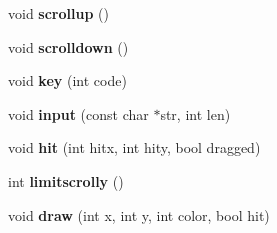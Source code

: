 \begin{DoxyCompactItemize}
void {\bfseries scrollup} ()
\item 
\mbox{\label{structeditor_a6173910e8a38625de244256ece5ee40f}} 
void {\bfseries scrolldown} ()
\item 
\mbox{\label{structeditor_aec26a5e5780a67244ae7edef506bc967}} 
void {\bfseries key} (int code)
\item 
\mbox{\label{structeditor_aceb6a8299b0181d2b88e6439bc5b1d27}} 
void {\bfseries input} (const char $\ast$str, int len)
\item 
\mbox{\label{structeditor_afea643d1c4eba985b6978b228a15f957}} 
void {\bfseries hit} (int hitx, int hity, bool dragged)
\item 
\mbox{\label{structeditor_a61d3b1198c453856c3ae69ce2c92b036}} 
int {\bfseries limitscrolly} ()
\item 
\mbox{\label{structeditor_addadc273617926d876d009c29b3440ae}} 
void {\bfseries draw} (int x, int y, int color, bool hit)
\end{DoxyCompactItemize}
